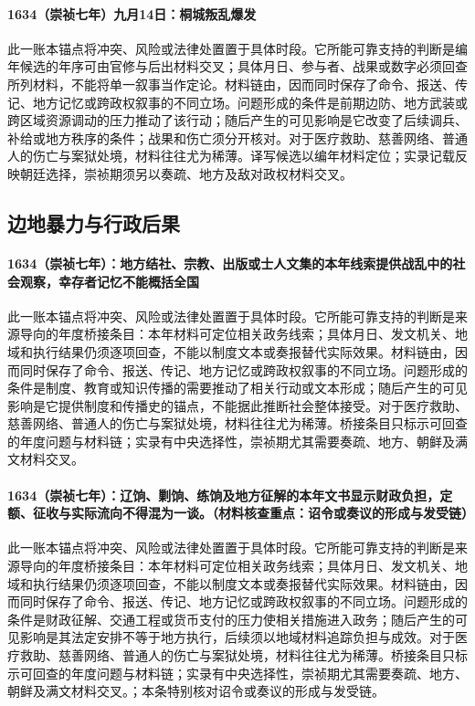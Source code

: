 \paragraph{1634（崇祯七年）九月14日：桐城叛乱爆发} 此一账本锚点将冲突、风险或法律处置置于具体时段。它所能可靠支持的判断是编年候选的年序可由官修与后出材料交叉；具体月日、参与者、战果或数字必须回查所列材料，不能将单一叙事当作定论。材料链由，因而同时保存了命令、报送、传记、地方记忆或跨政权叙事的不同立场。问题形成的条件是前期边防、地方武装或跨区域资源调动的压力推动了该行动；随后产生的可见影响是它改变了后续调兵、补给或地方秩序的条件；战果和伤亡须分开核对。对于医疗救助、慈善网络、普通人的伤亡与案狱处境，材料往往尤为稀薄。译写候选以编年材料定位；实录记载反映朝廷选择，崇祯期须另以奏疏、地方及敌对政权材料交叉。

\subsection{边地暴力与行政后果}

\paragraph{1634（崇祯七年）：地方结社、宗教、出版或士人文集的本年线索提供战乱中的社会观察，幸存者记忆不能概括全国} 此一账本锚点将冲突、风险或法律处置置于具体时段。它所能可靠支持的判断是来源导向的年度桥接条目：本年材料可定位相关政务线索；具体月日、发文机关、地域和执行结果仍须逐项回查，不能以制度文本或奏报替代实际效果。材料链由，因而同时保存了命令、报送、传记、地方记忆或跨政权叙事的不同立场。问题形成的条件是制度、教育或知识传播的需要推动了相关行动或文本形成；随后产生的可见影响是它提供制度和传播史的锚点，不能据此推断社会整体接受。对于医疗救助、慈善网络、普通人的伤亡与案狱处境，材料往往尤为稀薄。桥接条目只标示可回查的年度问题与材料链；实录有中央选择性，崇祯期尤其需要奏疏、地方、朝鲜及满文材料交叉。

\paragraph{1634（崇祯七年）：辽饷、剿饷、练饷及地方征解的本年文书显示财政负担，定额、征收与实际流向不得混为一谈。（材料核查重点：诏令或奏议的形成与发受链）} 此一账本锚点将冲突、风险或法律处置置于具体时段。它所能可靠支持的判断是来源导向的年度桥接条目：本年材料可定位相关政务线索；具体月日、发文机关、地域和执行结果仍须逐项回查，不能以制度文本或奏报替代实际效果。材料链由，因而同时保存了命令、报送、传记、地方记忆或跨政权叙事的不同立场。问题形成的条件是财政征解、交通工程或货币支付的压力使相关措施进入政务；随后产生的可见影响是其法定安排不等于地方执行，后续须以地域材料追踪负担与成效。对于医疗救助、慈善网络、普通人的伤亡与案狱处境，材料往往尤为稀薄。桥接条目只标示可回查的年度问题与材料链；实录有中央选择性，崇祯期尤其需要奏疏、地方、朝鲜及满文材料交叉。；本条特别核对诏令或奏议的形成与发受链。


